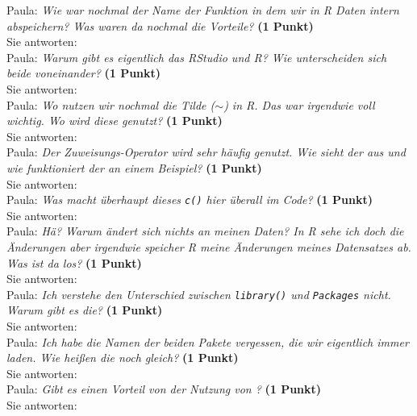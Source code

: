 \documentclass[a4paper, 9pt]{scrartcl}\usepackage[]{graphicx}\usepackage[]{xcolor}
\begin{document}
Paula: \textit{Wie war nochmal der Name der Funktion in dem wir in R Daten intern abspeichern? Was waren da nochmal die Vorteile?} \textbf{(1 Punkt)}\\[1ex]
Sie antworten:\\[3Ex]

Paula: \textit{Warum gibt es eigentlich das RStudio und R? Wie unterscheiden sich beide voneinander?} \textbf{(1 Punkt)}\\[1ex]
Sie antworten:\\[3Ex]

Paula: \textit{Wo nutzen wir nochmal die Tilde ($\sim$) in R. Das war irgendwie voll wichtig. Wo wird diese genutzt?} \textbf{(1 Punkt)}\\[1ex]
Sie antworten:\\[3Ex]

Paula: \textit{Der Zuweisungs-Operator wird sehr häufig genutzt. Wie sieht der aus und wie funktioniert der an einem Beispiel?} \textbf{(1 Punkt)}\\[1ex]
Sie antworten:\\[3Ex]

Paula: \textit{Was macht überhaupt dieses \texttt{c()} hier überall im \Rlogo Code?} \textbf{(1 Punkt)}\\[1ex]
Sie antworten:\\[3Ex]

Paula: \textit{Hä? Warum ändert sich nichts an meinen Daten? In R sehe ich doch die Änderungen aber irgendwie speicher R meine Änderungen meines Datensatzes ab. Was ist da los?} \textbf{(1 Punkt)}\\[1ex]
Sie antworten:\\[3Ex]

Paula: \textit{Ich verstehe den Unterschied zwischen \texttt{library()} und \texttt{Packages} nicht. Warum gibt es die?} \textbf{(1 Punkt)}\\[1ex]
Sie antworten:\\[3Ex]

Paula: \textit{Ich habe die Namen der beiden \Rlogo Pakete vergessen, die wir eigentlich immer laden. Wie heißen die noch gleich?} \textbf{(1 Punkt)}\\[1ex]
Sie antworten:\\[3Ex]

Paula: \textit{Gibt es einen Vorteil von der Nutzung von \Rlogo?} \textbf{(1 Punkt)}\\[1ex]
Sie antworten:\\[3Ex] 
\clearpage
\end{document}
